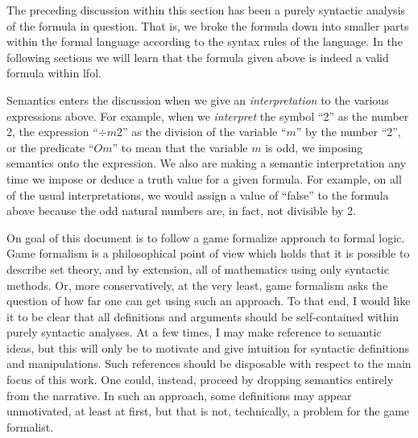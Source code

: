 \documentclass[12pt]{article}
\theoremstyle{break}
\theoremstyle{break}
\theoremstyle{break}
\theoremstyle{break}
\theoremstyle{break}
\newtheorem{informal definition}[definition]{Informal Definition}
\newcommand{\qq}[1]{``#1''}
\begin{document}
The preceding discussion within this section has been a purely syntactic analysis of the formula in question.
That is, we broke the formula down into smaller parts within the formal language according to the syntax rules of the language.
In the following sections we will learn that the formula given above is indeed a valid formula within \gls{lfol}.

Semantics enters the discussion when we give an \textit{interpretation} to the various expressions above.
For example, when we \textit{interpret} the symbol \qq{2} as the number 2, the expression \qq{$\div m 2$} as the division of the variable \qq{$m$} by the number \qq{2}, or the predicate \qq{$Om$} to mean that the variable $m$ is odd, we imposing semantics onto the expression.
We also are making a semantic interpretation any time we impose or deduce a truth value for a given formula.
For example, on all of the usual interpretations, we would assign a value of \qq{false} to the formula above because the odd natural numbers are, in fact, not divisible by 2.

On goal of this document is to follow a game formalize approach to formal logic.
Game formalism is a philosophical point of view which holds that it is possible to describe set theory, and by extension, all of mathematics using only syntactic methods.
Or, more conservatively, at the very least, game formalism asks the question of how far one can get using such an approach.
To that end, I would like it to be clear that all definitions and arguments should be self-contained within purely syntactic analyses.
At a few times, I may make reference to semantic ideas, but this will only be to motivate and give intuition for syntactic definitions and manipulations.
Such references should be disposable with respect to the main focus of this work.
One could, instead, proceed by dropping semantics entirely from the narrative.
In such an approach, some definitions may appear unmotivated, at least at first, but that is not, technically, a problem for the game formalist.
\end{document}
